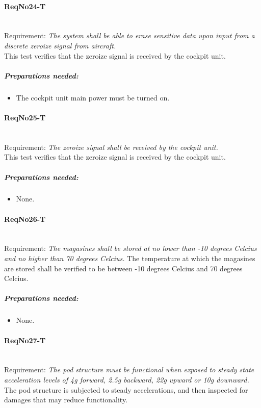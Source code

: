 \paragraph{ReqNo24-T}\mbox{}\\ %
Requirement: \textit{The system shall be able to erase sensitive data upon input from a discrete zeroize signal from aircraft.}\\

This test verifies that the zeroize signal is received by the cockpit unit.
	\subparagraph{Preparations needed:}
	\begin{itemize}
	\item The cockpit unit main power must be turned on.
	\end{itemize}
	
\paragraph{ReqNo25-T}\mbox{}\\ %
Requirement: \textit{The zeroize signal shall be received by the cockpit unit.}\\

This test verifies that the zeroize signal is received by the cockpit unit.
	\subparagraph{Preparations needed:}
	\begin{itemize}
	\item None.
	\end{itemize}

\paragraph{ReqNo26-T}\mbox{}\\ %
Requirement: \textit{The magasines shall be stored at no lower than -10 degrees Celcius and no higher than 70 degrees Celcius.}
The temperature at which the magasines are stored shall be verified to be between -10 degrees Celcius and 70 degrees Celcius.

	\subparagraph{Preparations needed:}
	\begin{itemize}
	\item None.
	\end{itemize}

\paragraph{ReqNo27-T}\mbox{}\\ %
Requirement: \textit{The pod structure must be functional when exposed to steady state acceleration levels of 4g forward, 2.5g backward, 22g upward or 10g downward.}
\\
The pod structure is subjected to steady accelerations, and then inspected for damages that may reduce functionality.


